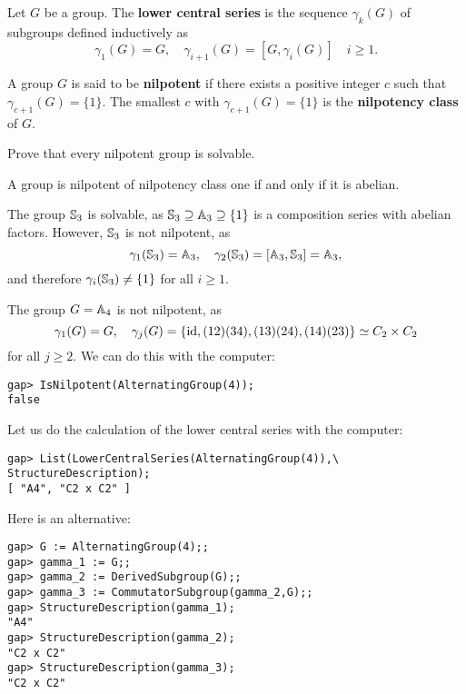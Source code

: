 
\begin{definition}
Let $G$ be a group. The \textbf{lower central series} 
is the sequence $\gamma_k(G)$ of subgroups defined inductively 
as 
\[
\gamma_1(G)=G,\quad
\gamma_{i+1}(G)=[G,\gamma_i(G)]\quad i\geq 1.
\]
\end{definition}

\begin{definition}
A group $G$ is said to be \textbf{nilpotent} if there exists a positive integer $c$ such that 
$\gamma_{c+1}(G)=\{1\}$. The smallest $c$ with $\gamma_{c+1}(G)=\{1\}$ is 
the \textbf{nilpotency class} of $G$.
\end{definition}

\begin{exercise}
\label{xca:nilpotent=>solvable}
Prove that every nilpotent group is solvable. 
\end{exercise}

A group is nilpotent of nilpotency class one if and only if it is abelian. 

\begin{example}
The group $\mathbb{S}_3$ is solvable, as 
$\mathbb{S}_3\supseteq \mathbb{A}_3\supseteq\{1\}$ is a composition series 
with abelian factors. However, $\mathbb{S}_3$ is not nilpotent, as 
\[
\gamma_1(\mathbb{S}_3)=\mathbb{A}_3,\quad
\gamma_2(\mathbb{S}_3)=[\mathbb{A}_3,\mathbb{S}_3]=\mathbb{A}_3, 
\]
and therefore $\gamma_i(\mathbb{S}_3)\ne\{1\}$ for all $i\geq1$. 
\end{example}

\begin{example}
The group $G=\mathbb{A}_4$ is not nilpotent, as 
\[
\gamma_1(G)=G,\quad
\gamma_j(G)=\{\operatorname{id},(12)(34),(13)(24),(14)(23)\}\simeq C_2\times C_2
\]
for all $j\geq2$. We can do this with the computer:
\begin{lstlisting}
gap> IsNilpotent(AlternatingGroup(4));
false
\end{lstlisting}
Let us do the calculation of the lower central series with the computer: 
\begin{lstlisting}
gap> List(LowerCentralSeries(AlternatingGroup(4)),\
StructureDescription);
[ "A4", "C2 x C2" ]
\end{lstlisting}
Here is an alternative:
\begin{lstlisting}
gap> G := AlternatingGroup(4);;
gap> gamma_1 := G;;
gap> gamma_2 := DerivedSubgroup(G);;
gap> gamma_3 := CommutatorSubgroup(gamma_2,G);;
gap> StructureDescription(gamma_1);
"A4"
gap> StructureDescription(gamma_2);
"C2 x C2"
gap> StructureDescription(gamma_3);
"C2 x C2"
\end{lstlisting}
\end{example}

